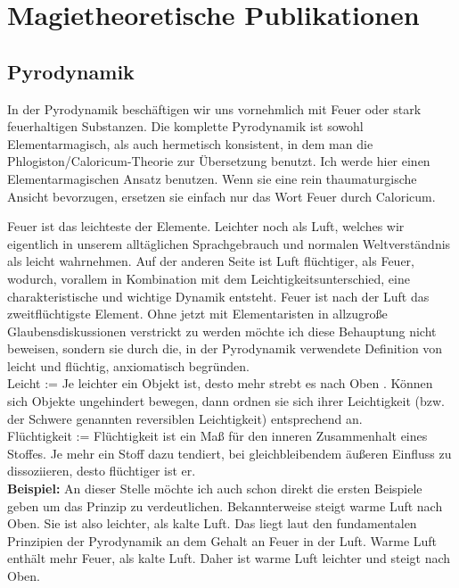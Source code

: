 \documentclass[a5paper,8pt]{book}
\begin{document}
\tableofcontents



\chapter{Magietheoretische Publikationen}

\section{Pyrodynamik}


In der Pyrodynamik beschäftigen wir uns vornehmlich mit Feuer oder stark feuerhaltigen Substanzen. Die komplette Pyrodynamik 
ist sowohl Elementarmagisch, als auch hermetisch konsistent, in dem man die Phlogiston/Caloricum-Theorie zur Übersetzung 
benutzt. Ich werde hier einen Elementarmagischen Ansatz benutzen. Wenn sie eine rein thaumaturgische Ansicht bevorzugen, 
ersetzen 
sie einfach nur das Wort Feuer durch Caloricum.

Feuer ist das leichteste der Elemente. Leichter noch als Luft, welches wir eigentlich in unserem alltäglichen Sprachgebrauch 
und normalen Weltverständnis als leicht wahrnehmen. Auf der anderen Seite ist Luft flüchtiger, als Feuer, wodurch, vorallem 
in Kombination mit dem Leichtigkeitsunterschied, eine charakteristische und wichtige Dynamik entsteht. Feuer ist nach der 
Luft das zweitflüchtigste Element.
Ohne jetzt mit Elementaristen in allzugroße Glaubensdiskussionen verstrickt zu werden möchte ich diese Behauptung nicht 
beweisen, sondern sie durch die, in der Pyrodynamik verwendete Definition von leicht und flüchtig, anxiomatisch begründen.\\

Leicht := Je leichter ein Objekt ist, desto mehr strebt es nach Oben \footnotemark[1].
Können sich Objekte ungehindert bewegen, dann ordnen sie sich ihrer Leichtigkeit (bzw. der Schwere genannten reversiblen 
Leichtigkeit) entsprechend an.\\

Flüchtigkeit := Flüchtigkeit ist ein Maß für den inneren Zusammenhalt eines Stoffes. Je mehr ein Stoff dazu tendiert, bei 
gleichbleibendem äußeren Einfluss zu dissoziieren, desto flüchtiger ist er.\\

\textbf{Beispiel:}
An dieser Stelle möchte ich auch schon direkt die ersten Beispiele geben um das Prinzip zu verdeutlichen. Bekannterweise 
steigt warme Luft nach Oben. Sie ist also leichter, als kalte Luft. Das liegt laut den fundamentalen Prinzipien der 
Pyrodynamik an dem Gehalt an Feuer in der Luft. Warme Luft enthält mehr Feuer, als kalte Luft. Daher ist warme Luft 
leichter und steigt nach Oben.\\
\end{document}
